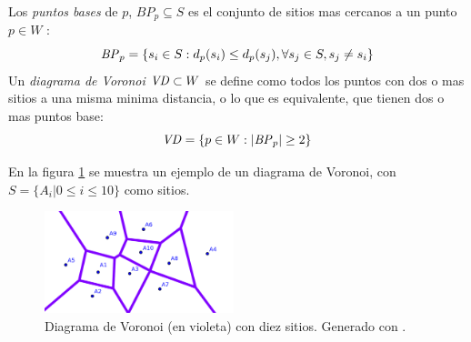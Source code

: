Los \emph{puntos bases} de $p$, $BP_p \subseteq S$ es el conjunto de sitios mas cercanos a un punto $p \in W$ :
\begin{equation}
  \mathit{BP}_p =\{s_i \in S: d_p(s_i) \leq d_p(s_j), \forall s_j\in S,s_j \neq s_i\}\label{eq:bases}
\end{equation}
Un \emph{diagrama de Voronoi} $\mathit{VD}\subset W$ se define como todos los puntos con dos o mas sitios a una misma minima distancia, o lo que es equivalente, que tienen dos o mas puntos base: 
\begin{equation}
  \mathit{VD} = \{p \in W : |\mathit{BP}_p| \geq 2\}\label{eq:DV}
\end{equation}


En la figura \ref{fig:ejemploVoronoi} se muestra un ejemplo de un diagrama de Voronoi, con $S=\{A_i | 0\leq i \leq 10\}$ como sitios.
\begin{figure}[H]
  \center
  \includegraphics[width=5.5cm]{imagenes/VD.png}
  \caption{Diagrama de Voronoi (en violeta) con diez sitios. Generado con \cite{voronoigeo}.}\label{fig:ejemploVoronoi}
\end{figure} 


